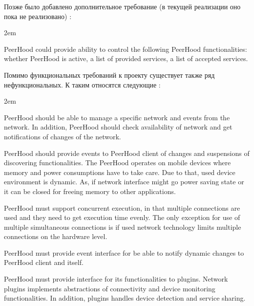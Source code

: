 Позже было добавлено дополнительное требование (в текущей реализации \PeerHood оно пока 
не реализовано) :
\begin{description}
	\leftskip2em%
	\setlength{\itemsep}{0pt}%
	\setlength{\parsep}{0pt}%
	\item[User control] PeerHood could provide ability to control the following PeerHood 
		functionalities: whether PeerHood is active, a list of provided services, a list of 
		accepted services.
\end{description}

\Sentence
Помимо функциональных требований к проекту \PeerHood существует также ряд нефункциональных.
\Sentence
К таким относятся следующие :
\begin{description}
	\leftskip2em%
	\setlength{\itemsep}{0pt}%
	\setlength{\parsep}{0pt}%
	\item[Network management] PeerHood should be able to manage a specific network and 
	events from the network. 
	\Sentence
	In addition, PeerHood should check availability of network and get notifications of changes 
	of the network.

	\item[Component management] PeerHood should provide events to PeerHood client of 
	changes and suspensions of discovering functionalities. 
	\Sentence
	The PeerHood operates on mobile devices where memory and power consumptions have to take 
	care. 
	\Sentence
	Due to that, used device environment is dynamic. 
	\Sentence
	As, if network interface might go power saving state or it can be closed for freeing memory 
	to other applications.

	\item[Communication concurrency base] PeerHood must support concurrent execution, 
	in that multiple connections are used and they need to get execution time evenly. 
	\Sentence
	The only exception for use of multiple simultaneous connections is if used network 
	technology limits multiple connections on the hardware level.

	\item[Event interface] PeerHood must provide event interface for be able to notify 
	dynamic changes to PeerHood client and itself.

	\item[Plugin architecture for networks] PeerHood must provide interface for its 
	functionalities to plugins. 
	\Sentence
	Network plugins implements abstractions of connectivity and device monitoring 
	functionalities. 
	\Sentence
	In addition, plugins handles device detection and service sharing.
\end{description}

